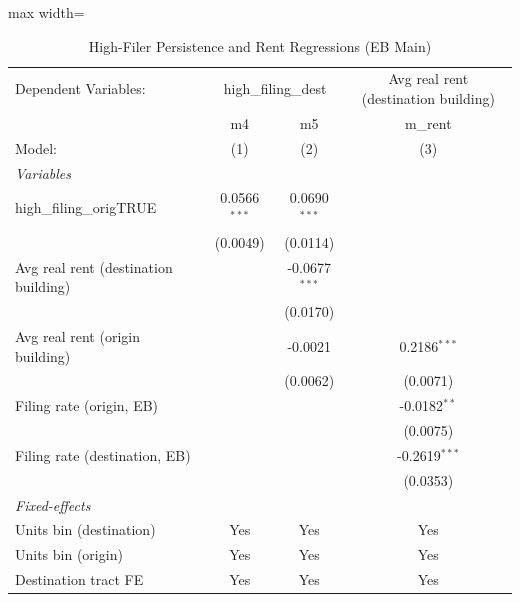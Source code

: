 \documentclass[
  11pt,
]{article}
\begin{document}
\begin{table}[htbp]
\centering
\caption{\label{tab:evict_persist_hf_rent} High-Filer Persistence and Rent Regressions (EB Main)}
\centering

\begin{adjustbox}{max width=\textwidth}
   \begin{tabular}{lccc}
      \tabularnewline \midrule \midrule
      Dependent Variables: & \multicolumn{2}{c}{high\_filing\_dest} & Avg real rent (destination building)\\
                                           & m4             & m5              & m\_rent \\    
      Model:                               & (1)            & (2)             & (3)\\  
      \midrule
      \emph{Variables}\\
      high\_filing\_origTRUE               & 0.0566$^{***}$ & 0.0690$^{***}$  &   \\   
                                           & (0.0049)       & (0.0114)        &   \\   
      Avg real rent (destination building) &                & -0.0677$^{***}$ &   \\   
                                           &                & (0.0170)        &   \\   
      Avg real rent (origin building)      &                & -0.0021         & 0.2186$^{***}$\\   
                                           &                & (0.0062)        & (0.0071)\\   
      Filing rate (origin, EB)             &                &                 & -0.0182$^{**}$\\   
                                           &                &                 & (0.0075)\\   
      Filing rate (destination, EB)        &                &                 & -0.2619$^{***}$\\   
                                           &                &                 & (0.0353)\\   
      \midrule
      \emph{Fixed-effects}\\
      Units bin (destination)              & Yes            & Yes             & Yes\\  
      Units bin (origin)                   & Yes            & Yes             & Yes\\  
      Destination tract FE                 & Yes            & Yes             & Yes\\  

\end{tabular}
\end{adjustbox}
\end{table}
\end{document}
